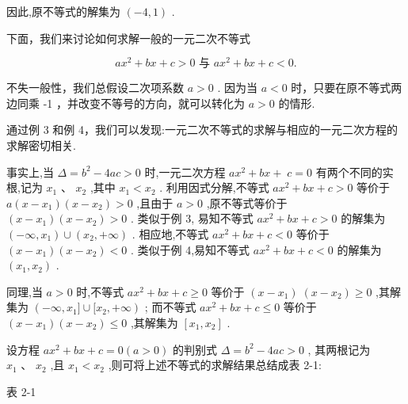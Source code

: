 \documentclass[10pt]{article}
\begin{document}
因此,原不等式的解集为 \(\left( {-4,1}\right)\) .

下面，我们来讨论如何求解一般的一元二次不等式

\[
a{x}^{2} + {bx} + c > 0\text{ 与 }a{x}^{2} + {bx} + c < 0.
\]

不失一般性，我们总假设二次项系数 \(a > 0\) . 因为当 \(a < 0\) 时，只要在原不等式两边同乘 -1 ，并改变不等号的方向，就可以转化为 \(a > 0\) 的情形.

通过例 3 和例 4，我们可以发现:一元二次不等式的求解与相应的一元二次方程的求解密切相关.

事实上,当 \(\Delta  = {b}^{2} - {4ac} > 0\) 时,一元二次方程 \(a{x}^{2} + {bx} + \; c = 0\) 有两个不同的实根,记为 \({x}_{1}\text{ 、 }{x}_{2}\) ,其中 \({x}_{1} < {x}_{2}\) . 利用因式分解,不等式 \(a{x}^{2} + {bx} + c > 0\) 等价于 \(a\left( {x - {x}_{1}}\right) \left( {x - {x}_{2}}\right)  > 0\) ,且由于 \(a > 0\) ,原不等式等价于 \(\left( {x - {x}_{1}}\right) \left( {x - {x}_{2}}\right)  > 0\) . 类似于例 3, 易知不等式 \(a{x}^{2} + {bx} + c > 0\) 的解集为 \(\left( {-\infty ,{x}_{1}}\right)  \cup  \left( {{x}_{2}, + \infty }\right)\) . 相应地,不等式 \(a{x}^{2} + {bx} + c < 0\) 等价于 \(\left( {x - {x}_{1}}\right) \left( {x - {x}_{2}}\right)  < 0\) . 类似于例 4,易知不等式 \(a{x}^{2} + {bx} + c < 0\) 的解集为 \(\left( {{x}_{1},{x}_{2}}\right)\) .

同理,当 \(a > 0\) 时,不等式 \(a{x}^{2} + {bx} + c \geq  0\) 等价于 \(\left( {x - {x}_{1}}\right) \; \left( {x - {x}_{2}}\right)  \geq  0\) ,其解集为 \(\left( {-\infty ,{x}_{1}\rbrack \cup \lbrack {x}_{2}, + \infty }\right)\) ; 而不等式 \(a{x}^{2} + {bx} + c \leq  0\) 等价于 \(\left( {x - {x}_{1}}\right) \left( {x - {x}_{2}}\right)  \leq  0\) ,其解集为 \(\left\lbrack  {{x}_{1},{x}_{2}}\right\rbrack\) .

设方程 \(a{x}^{2} + {bx} + c = 0\left( {a > 0}\right)\) 的判别式 \(\Delta  = {b}^{2} - {4ac} > 0\) , 其两根记为 \({x}_{1}\text{ 、 }{x}_{2}\) ,且 \({x}_{1} < {x}_{2}\) ,则可将上述不等式的求解结果总结成表 2-1:





表 2-1

\begin{center}
\end{center}
\end{document}
